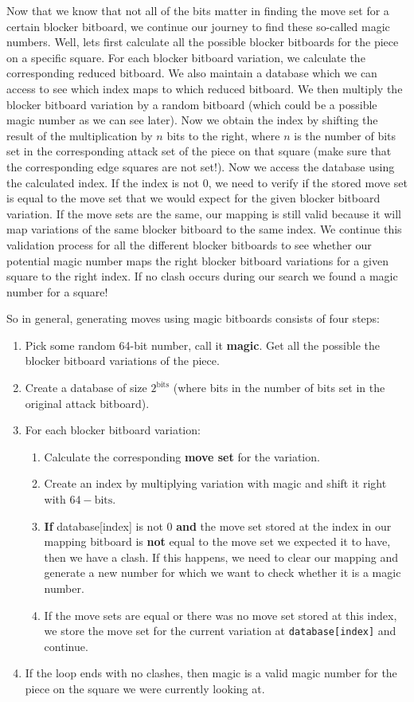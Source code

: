 %
Now that we know that not all of the bits matter in finding the move set for a certain blocker bitboard, we continue our journey to find these so-called magic numbers.
Well, lets first calculate all the possible blocker bitboards for the piece on a specific square.
For each blocker bitboard variation, we calculate the corresponding reduced bitboard.
We also maintain a database which we can access to see which index maps to which reduced bitboard.
We then multiply the blocker bitboard variation by a random bitboard (which could be a possible magic number as we can see later).
Now we obtain the index by shifting the result of the multiplication by $n$ bits to the right, where $n$ is the number of bits set in the corresponding attack set of the piece on that square (make sure that the corresponding edge squares are not set!).
Now we access the database using the calculated index.
If the index is not 0, we need to verify if the stored move set is equal to the move set that we would expect for the given blocker bitboard variation.
If the move sets are the same, our mapping is still valid because it will map variations of the same blocker bitboard to the same index.
We continue this validation process for all the different blocker bitboards to see whether our potential magic number maps the right blocker bitboard variations for a given square to the right index.
If no clash occurs during our search we found a magic number for a square!

So in general, generating moves using magic bitboards consists of four steps:
%
\begin{enumerate}
	\item Pick some random 64-bit number, call it \textbf{magic}.
	Get all the possible the blocker bitboard variations of the piece.
	\item Create a database of size $2^{\text{bits}}$ (where bits in the number of bits set in the original attack bitboard).
	\item For each blocker bitboard variation:
	\begin{enumerate}
		\item Calculate the corresponding \textbf{move set} for the variation. 

		\item Create an index by multiplying variation with magic and shift it right with $64 - \text{bits}$.
		\item \textbf{If} database[index] is not 0 \textbf{and} the move set stored at the index in our mapping bitboard is \textbf{not} equal to the move set we expected it to have, then we have a clash. If this happens, we need to clear our mapping and generate a new number for which we want to check whether it is a magic number.
		 
	\item If the move sets are equal or there was no move set stored at this index, we store the move set for the current variation at \texttt{database[index]} and continue.
	\end{enumerate}
	\item If the loop ends with no clashes, then magic is a valid magic number for the piece on the square we were currently looking at.
\end{enumerate}
%
